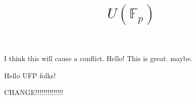 \documentclass{amsart}
\begin{document}
I think this will cause a conflict. 
 Hello! This is great. maybe. 


    \title{$U(\mathbb{F}_p)$}



    \maketitle

 Hello UFP folks!

CHANGE!!!!!!!!!!!!!!
\end{document}

